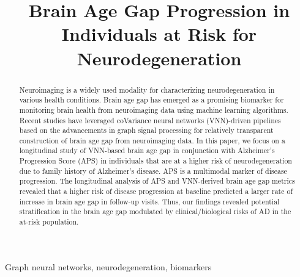 \documentclass[conference]{IEEEtran}
\begin{document}
\title{Brain Age Gap Progression in Individuals at Risk for Neurodegeneration}

\author{
}

\maketitle

\begin{abstract}
Neuroimaging is a widely used modality for characterizing neurodegeneration in various health conditions. Brain age gap has emerged as a promising biomarker for monitoring brain health from neuroimaging data using machine learning algorithms. Recent studies have leveraged coVariance neural networks (VNN)-driven pipelines based on the advancements in graph signal processing for relatively transparent construction of brain age gap from neuroimaging data. In this paper, we focus on a longitudinal study of VNN-based brain age gap in conjunction with Alzheimer's Progression Score (APS) in individuals that are at a higher risk of neurodegeneration due to family history of Alzheimer's disease. APS is a multimodal marker of disease progression. The longitudinal analysis of APS and VNN-derived brain age gap metrics revealed that a higher risk of disease progression at baseline predicted a larger rate of increase in brain age gap in follow-up visits. Thus, our findings revealed potential stratification in the brain age gap modulated by clinical/biological risks of AD in the at-risk population.
\end{abstract}

\begin{IEEEkeywords}
Graph neural networks, neurodegeneration, biomarkers
\end{IEEEkeywords}
\end{document}
